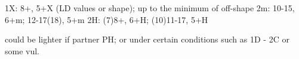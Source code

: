 1X: 8+, 5+X (LD values or shape); up to the minimum of off-shape
2m: 10-15, 6+m; 12-17(18), 5+m
2H: (7)8+, 6+H; (10)11-17, 5+H

could be lighter if partner PH; or under certain conditions such as 1D - 2C or some vul.
